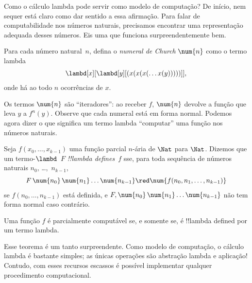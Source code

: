 \documentclass[../../../include/open-logic-section]{subfiles}
\begin{document}

Como o cálculo lambda pode servir como modelo de computação? De início, nem
sequer está claro como dar sentido a essa afirmação. Para falar de
computabilidade nos números naturais, precisamos encontrar uma
representação adequada desses números. Eis uma que funciona
surpreendentemente bem.

\begin{defn}
Para cada número natural~$n$, defina o \emph{numeral de Church} $\num{n}$
como o termo lambda
\[
  \lambd[x][\lambd[y][(x(x(x(\dots x(y)))))]],
\]
onde há ao todo $n$ ocorrências de $x$.
\end{defn}

Os termos $\num{n}$ são ``iteradores'': ao receber $f$, $\num{n}$ devolve a
função que leva $y$ a $f^n(y)$. Observe que cada numeral está em forma
normal. Podemos agora dizer o que significa um termo lambda ``computar''
uma função nos números naturais.

\begin{defn}
Seja $f(x_0, \dots, x_{k-1})$ uma função parcial $n$-ária de $\Nat$ para
$\Nat$. Dizemos que um termo-$\lambd$~$F$ \emph{!!{lambda define}s}~$f$ sse,
para toda sequência de números naturais $n_0$, \dots,~$n_{k-1}$,
\[
F\, \num{n_0}\, \num{n_1} \dots \num{n_{k-1}} \red \num{f(n_0, n_1, \dots,
  n_{k-1})}
\]
se $f(n_0, \dots, n_{k-1})$ está definida, e $F, \num{n_0}\, \num{n_1}
\dots \num{n_{k-1}}$ não tem forma normal caso contrário.
\end{defn}

\begin{thm}
Uma função $f$ é parcialmente computável se, e somente se, é
!!{lambda defined} por um termo lambda.
\end{thm}

\begin{explain}
Esse teorema é um tanto surpreendente. Como modelo de computação, o cálculo
lambda é bastante simples; as únicas operações são abstração lambda e
aplicação!{} Contudo, com esses recursos escassos é possível implementar
qualquer procedimento computacional.
\end{explain}
\end{document}
